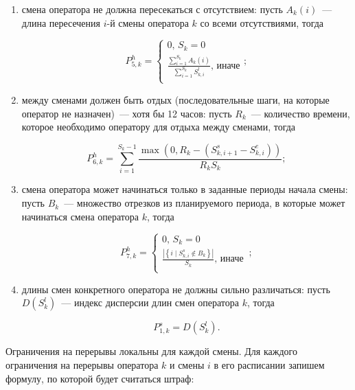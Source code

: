 \documentclass[times,specification,annotation]{itmo-student-thesis}
\begin{document}
\begin{enumerate}
    \item смена оператора не должна пересекаться с отсутствием: пусть $A_k(i)$~--- длина пересечения $i$-й смены оператора $k$ со всеми отсутствиями, тогда
    
    \begin{equation} P^h_{5, k} = \begin{cases} 0,\, S_k = 0 \\ \frac{\sum\limits_{i = 1}^{S_k}{A_k(i)}}{\sum\limits_{i = 1}^{S_k}{S^l_{k, i}}},\, \text{иначе} \\ \end{cases}; \end{equation}
    
    \item между сменами должен быть отдых (последовательные шаги, на которые оператор не назначен)~--- хотя бы 12 часов: пусть $R_k$~--- количество времени, которое необходимо оператору для отдыха между сменами, тогда
    
    \begin{equation} P^h_{6, k} = \sum\limits_{i = 1}^{S_k - 1} \frac{\max{\left( 0, R_k - \left(S^s_{k, i + 1} - S^e_{k, i} \right) \right)}}{R_k S_k}; \end{equation}

    \item смена оператора может начинаться только в заданные периоды начала смены: пусть $B_k$~--- множество отрезков из планируемого периода, в которые может начинаться смена оператора $k$, тогда
    
    \begin{equation} P^h_{7, k} = \begin{cases} 0,\, S_k = 0 \\ \frac{\left| \left\{i \mid S^s_{k, i} \notin B_k \right\} \right|}{S_k},\, \text{иначе} \\ \end{cases}\,;  \end{equation}
    
    \item длины смен конкретного оператора не должны сильно различаться: пусть $D(S^l_k)$~--- индекс дисперсии длин смен оператора $k$, тогда
    
    \begin{equation} P^s_{1, k} = D(S^l_k). \end{equation}

\end{enumerate}

Ограничения на перерывы локальны для каждой смены.
Для каждого ограничения на перерывы оператора $k$ и смены $i$ в его расписании запишем формулу, по которой будет считаться штраф:
\end{document}
